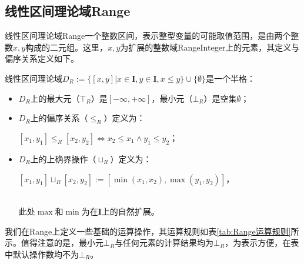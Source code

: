 \subsection{线性区间理论域Range}

线性区间理论域Range一个整数区间，表示整型变量的可能取值范围，是由两个整数$ x, y $构成的二元组。这里，$ x, y $为扩展的整数域RangeInteger上的元素，其定义与偏序关系定义如下。

\begin{definition}
	线性区间理论域$ D_R :=  \{ [x, y] | x \in \mathbf{I}, y \in \mathbf{I}, x \le y \} \cup \{ \emptyset \}$是一个半格：	
	\begin{itemize}
		\item $ D_R $上的最大元（$ \top_R $）是$ [-\infty, +\infty] $，最小元（$ \bot_R $）是空集$ \emptyset $；
		\item $ D_R $上的偏序关系（$ \le_R $）定义为：\\	
		\centerline{$ [x_1, y_1] \le_R [x_2, y_2] \iff x_2 \le x_1 \land y_1 \le y_2 $；}
		\item $ D_R $上的上确界操作（$ \sqcup_R $）定义为：\\	
		\centerline{$ [x_1, y_1] \sqcup_R [x_2, y_2] := [\min(x_1, x_2), \max(y_1, y_2)] $，}  \\
		此处$ \max $和$ \min $为在$ \mathbf{I} $上的自然扩展。
	\end{itemize}
\end{definition}

我们在Range上定义一些基础的运算操作，其运算规则如表\ref{tab:Range运算规则}所示。值得注意的是，最小元$ \bot_R $与任何元素的计算结果均为$ \bot_R $，为表示方便，在表中默认操作数均不为$ \bot_R $。

